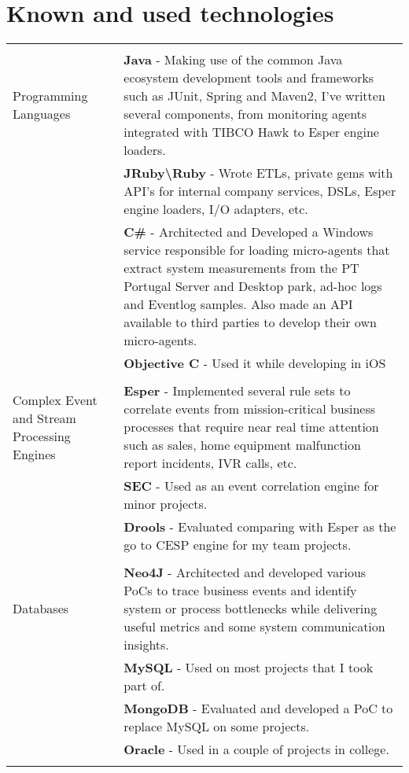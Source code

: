 \documentclass[a4paper,10pt]{article}
\begin{document}
\section{Known and used technologies}
\begin{tabular}{p{4cm}|p{9cm}}
\multicolumn{2}{c}{} \\
	Programming Languages
	& {\bf Java} - Making use of the common Java ecosystem development tools and
frameworks such as JUnit, Spring and Maven2, I’ve written several components,
from monitoring agents integrated with TIBCO Hawk to Esper engine loaders.  \\
	& {\bf JRuby\textbackslash Ruby} - Wrote ETLs, private gems with API’s for internal company
services, DSLs, Esper engine loaders, I/O adapters, etc.\\
	& {\bf C\# } - Architected and Developed a Windows service responsible for loading micro-agents that extract
system measurements from the PT Portugal Server and Desktop park, ad-hoc logs
and Eventlog samples. Also made an API available to third parties to develop their own micro-agents.\\
	& {\bf Objective C} - Used it while developing in iOS\\
\multicolumn{2}{c}{} \\
	Complex Event and Stream Processing Engines
	& {\bf Esper} - Implemented several rule sets to correlate events from mission-critical
business processes that require near real time attention such as sales, home
equipment malfunction report incidents, IVR calls, etc.\\
	& {\bf SEC} - Used as an event correlation engine for minor projects. \\
	& {\bf Drools} - Evaluated comparing with Esper as the go to CESP engine for my team projects. \\
\multicolumn{2}{c}{} \\
	Databases
	& {\bf Neo4J} - Architected and developed various PoCs to trace business events and
identify system or process bottlenecks while delivering useful metrics and some
system communication insights.\\ 
	& {\bf MySQL} - Used on most projects that I took part of. \\
	& {\bf MongoDB} - Evaluated and developed a PoC to replace MySQL on some projects. \\
	& {\bf Oracle} - Used in a couple of projects in college.\\
\multicolumn{2}{c}{} \\

\end{tabular}
\end{document}
